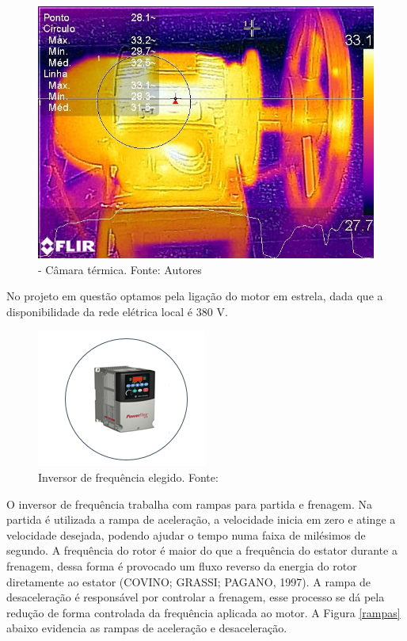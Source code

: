 \begin{figure}[h!]
    \centering
	\includegraphics[keepaspectratio=true,scale= 0.5]{figuras/camera.jpg}
	\caption{- Câmara térmica. Fonte: Autores}
    \label{camera}
\end{figure}

No projeto em questão optamos pela ligação do motor em estrela, dada que a disponibilidade da rede elétrica local é 380 V.

\begin{figure}[!h]
	\centering
		\includegraphics[keepaspectratio=true,scale=1.0]{figuras/3.png}
	\caption{Inversor de frequência elegido. Fonte: \cite{allen}}
    \label{inversor}
\end{figure}

O inversor de frequência trabalha com rampas para partida e frenagem. Na partida é utilizada a rampa de aceleração, a velocidade inicia em zero e atinge a velocidade desejada, podendo ajudar o tempo numa faixa de milésimos de segundo. A frequência do rotor é maior do que a frequência do estator durante a frenagem, dessa forma é provocado um fluxo reverso da energia do rotor diretamente ao estator (COVINO; GRASSI; PAGANO, 1997). A rampa de desaceleração é responsável por controlar a frenagem, esse processo se dá pela redução de forma controlada da frequência aplicada ao motor. 
A Figura \ref{rampas} abaixo evidencia as rampas de aceleração e desaceleração.

